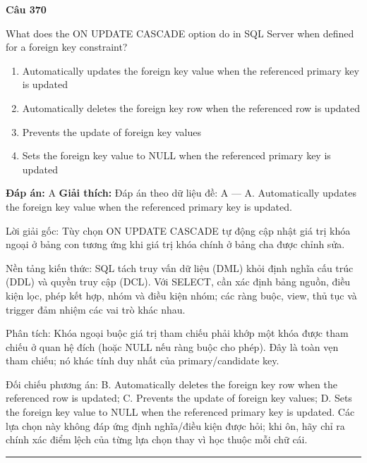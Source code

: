 \documentclass[11pt,a4paper]{article}
\newenvironment{question}[1]{%
  \par\vspace{1em}\noindent\textbf{\large Câu #1}\par\vspace{0.4em}
}{%
  \par\vspace{1em}\hrule\vspace{0.6em}
}
\newenvironment{choices}{%
  \begin{enumerate}[label=\textbf{\Alph*.},leftmargin=2.2em,itemsep=2pt,topsep=3pt]
}{%
  \end{enumerate}
}
\newcommand{\choice}{\item}
\begin{document}
\begin{question}{370}
What does the ON UPDATE CASCADE option do in SQL Server when defined for a foreign key constraint?
\begin{choices}
\choice Automatically updates the foreign key value when the referenced primary key is updated
\choice Automatically deletes the foreign key row when the referenced row is updated
\choice Prevents the update of foreign key values
\choice Sets the foreign key value to NULL when the referenced primary key is updated
\end{choices}
\textbf{Đáp án:} A
\textbf{Giải thích:} Đáp án theo dữ liệu đề: A — A. Automatically updates the foreign key value when the referenced primary key is updated.

Lời giải gốc: Tùy chọn ON UPDATE CASCADE tự động cập nhật giá trị khóa ngoại ở bảng con tương ứng khi giá trị khóa chính ở bảng cha được chỉnh sửa.

Nền tảng kiến thức: SQL tách truy vấn dữ liệu (DML) khỏi định nghĩa cấu trúc (DDL) và quyền truy cập (DCL). Với SELECT, cần xác định bảng nguồn, điều kiện lọc, phép kết hợp, nhóm và điều kiện nhóm; các ràng buộc, view, thủ tục và trigger đảm nhiệm các vai trò khác nhau.

Phân tích: Khóa ngoại buộc giá trị tham chiếu phải khớp một khóa được tham chiếu ở quan hệ đích (hoặc NULL nếu ràng buộc cho phép). Đây là toàn vẹn tham chiếu; nó khác tính duy nhất của primary/candidate key.

Đối chiếu phương án: B. Automatically deletes the foreign key row when the referenced row is updated; C. Prevents the update of foreign key values; D. Sets the foreign key value to NULL when the referenced primary key is updated. Các lựa chọn này không đáp ứng định nghĩa/điều kiện được hỏi; khi ôn, hãy chỉ ra chính xác điểm lệch của từng lựa chọn thay vì học thuộc mỗi chữ cái.
\end{question}
\end{document}
